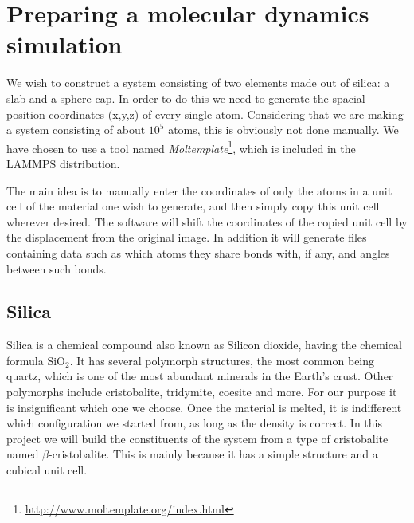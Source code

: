 \documentclass[twoside,english]{uiofysmaster}
\begin{document}
\chapter{Preparing a molecular dynamics simulation}

We wish to construct a system consisting of {\color{red} two} elements made out of silica: a slab and a sphere cap. In order to do this we need to generate the spacial position coordinates (x,y,z) of every single atom. Considering that we are making a system consisting of about $10^5$ atoms, this is obviously not done manually. We have chosen to use a tool named \textit{Moltemplate}\footnote{\href{http://www.moltemplate.org/index.html}{http://www.moltemplate.org/index.html}}, which is included in the LAMMPS distribution.

The main idea is to manually enter the coordinates of only the atoms in a unit cell of the material one wish to generate, and then simply copy this unit cell wherever desired. The software will shift the coordinates of the copied unit cell by the displacement from the original image. In addition it will generate files containing data such as which atoms they share bonds with, if any, and angles between such bonds. 

\section{Silica}
Silica is a chemical compound also known as Silicon dioxide, having the chemical formula SiO$_2$. It has several polymorph structures, the most common being quartz, which is one of the most abundant minerals in the Earth's crust. Other polymorphs include cristobalite, tridymite, coesite and more.    
For our purpose it is insignificant which one we choose. 
Once the material is melted, it is indifferent which configuration we started from, as long as the density is correct.
In this project we will build the constituents of the system from a type of cristobalite named $\beta$-cristobalite. This is mainly because it has a simple structure and a cubical unit cell.
\end{document}
